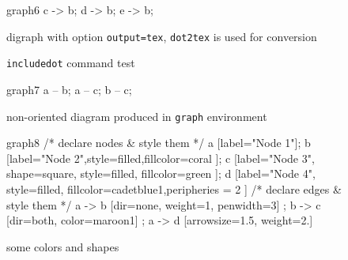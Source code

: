 \documentclass[a4paper,10pt]{article}
\begin{document}
\begin{figure}
  \begin{digraph}[output=tex]{graph6}
      c -> b;
      d -> b;
      e -> b;
  \end{digraph}
  \caption{digraph with option \texttt{output=tex}, \texttt{dot2tex} is used for conversion}
\end{figure}

\begin{figure}
 \caption{\texttt{includedot} command test}
\end{figure}

\begin{figure}
  \begin{graph}[scale=0.5]{graph7}
      a -- b;
      a -- c;
      b -- c;
  \end{graph}
  \caption{non-oriented diagram produced in \texttt{graph} environment}
\end{figure}

\begin{figure}
  \begin{digraph}[scale=0.8]{graph8}
    /* declare nodes & style them */
    a [label="Node 1"];
    b [label="Node 2",style=filled,fillcolor=coral ];
    c [label="Node 3", shape=square, style=filled, fillcolor=green ];
    d [label="Node 4", style=filled, fillcolor=cadetblue1,peripheries = 2  ]
    /* declare edges & style them */
    a -> b [dir=none, weight=1, penwidth=3] ;
    b -> c [dir=both, color=maroon1] ;
    a -> d [arrowsize=1.5, weight=2.]
  \end{digraph}
  \caption{some colors and shapes}
\end{figure}
\end{document}
